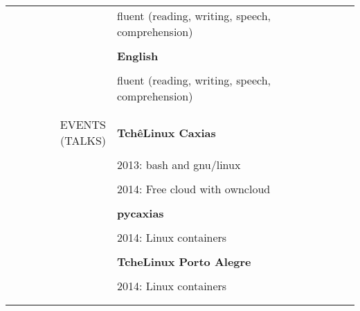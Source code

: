 \begin{tabular}{rp{12cm}}
    & fluent (reading, writing, speech, comprehension) \\\\
    & \textbf{English} \\\\
    & fluent (reading, writing, speech, comprehension)
    \\\\
    \hline
    \\
    \uppercase{Events (talks)}
    & \textbf{TchêLinux Caxias} \\\\
    & 2013: bash and gnu/linux \\\\
    & 2014: Free cloud with owncloud \\\\
    & \textbf{pycaxias} \\\\
    & 2014: Linux containers \\\\
    & \textbf{TcheLinux Porto Alegre} \\\\
    & 2014: Linux containers
    \\\\
    \hline
    \\
\end{tabular}
